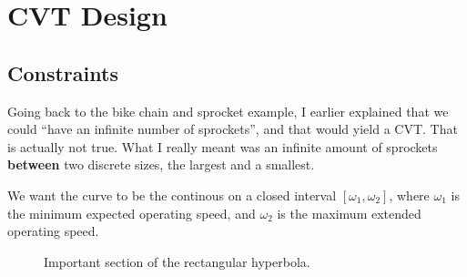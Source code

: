 \documentclass[12pt]{article}
\begin{document}
\section{CVT Design}

\subsection{Constraints}

Going back to the bike chain and sprocket example, I earlier explained that we could ``have an infinite number of sprockets'', and that would yield a CVT. That is actually not true. What I really meant was an infinite amount of sprockets \textbf{between} two discrete sizes, the largest and a smallest. 

We want the curve to be the continous on a closed interval $[\omega_{1},\omega_{2}]$, where $\omega_{1}$ is the minimum expected operating speed, and $\omega_{2}$ is the maximum extended operating speed. 

\begin{figure}[H]
  \centering
  
  \caption{Important section of the rectangular hyperbola.}\label{fig:omega_constraints}
\end{figure}
\end{document}
